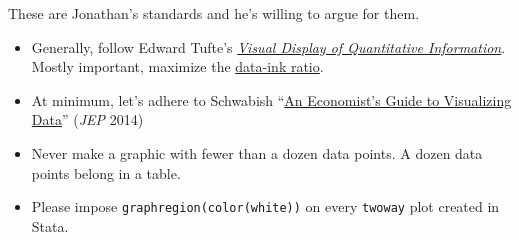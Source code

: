 These are Jonathan's standards and he's willing to argue for them.

\begin{itemize}
	\item Generally, follow Edward Tufte's \href{https://www.edwardtufte.com/tufte/books_vdqi}{\textit{Visual Display of Quantitative Information}}.
	Mostly important, maximize the \href{https://www.coursera.org/learn/python-plotting/lecture/qFnP9/graphical-heuristics-data-ink-ratio-edward-tufte}{data-ink ratio}.
	\item At minimum, let's adhere to Schwabish ``\href{https://www.aeaweb.org/articles?id=10.1257/jep.28.1.209}{An Economist's Guide to Visualizing Data}'' (\textit{JEP} 2014)
	\item Never make a graphic with fewer than a dozen data points. A dozen data points belong in a table.
	\item Please impose \texttt{graphregion(color(white))} on every \texttt{twoway} plot created in Stata.
\end{itemize}
